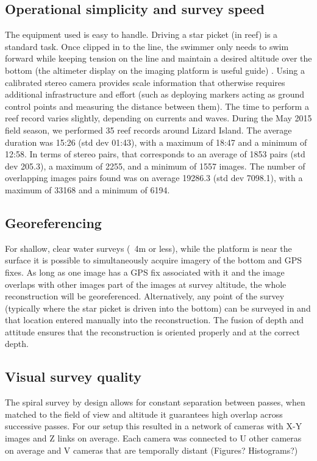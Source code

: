 \subsection{Operational simplicity and survey speed}
The equipment used is easy to handle. Driving a star picket (in reef) is a standard task. Once clipped in to the line, the swimmer only needs to swim forward while keeping tension on the line and maintain a desired altitude over the bottom (the altimeter display on the imaging platform is useful guide) .
Using a calibrated stereo camera provides scale information that otherwise requires additional infrastructure and effort (such as deploying markers acting as ground control points and measuring the distance between them). 
The time to perform a reef record varies slightly, depending on currents and waves. During the May 2015 field season, we performed 35 reef records around Lizard Island. The average duration was 15:26 (std dev 01:43), with a maximum of 18:47 and a minimum of 12:58. In terms of stereo pairs, that corresponds to an average of 1853 pairs (std dev 205.3), a maximum of 2255, and a minimum of 1557 images. The number of overlapping images pairs found was on average 19286.3 (std dev 7098.1), with a maximum of 33168 and a minimum of 6194.


\subsection{Georeferencing}
For shallow, clear water surveys (~4m or less), while the platform is near the surface it is possible to simultaneously acquire imagery of the bottom and GPS fixes. As long as one image has a GPS fix associated with it and the image overlaps with other images part of the images at survey altitude, the whole reconstruction will be georeferenced. Alternatively, any point of the survey (typically where the star picket is driven into the bottom) can be surveyed in and that location entered manually into the reconstruction.  
The fusion of depth and attitude ensures that the reconstruction is oriented properly and at the correct depth.

\subsection{Visual survey quality}
The spiral survey by design allows for constant separation between passes, when matched to the field of view and altitude it guarantees high overlap across successive passes. For our setup this resulted in a network of cameras with X-Y images and Z links on average. Each camera was connected to U other cameras on average and V cameras that are temporally distant (Figures? Histograms?)


